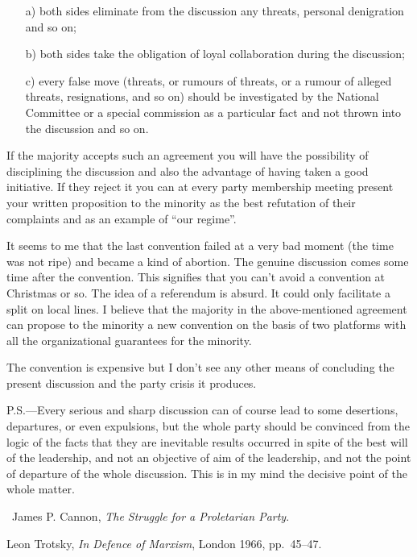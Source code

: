 \begin{enumerate}
  \item[a)] both sides eliminate from the discussion any threats, personal denigration and so on;
  \item[b)] both sides take the obligation of loyal collaboration during the discussion;
  \item[c)] every false move (threats, or rumours of threats, or a rumour of alleged threats, resignations, and so on) should be investigated by the National Committee or a special commission as a particular fact and not thrown into the discussion and so on.
\end{enumerate}

If the majority accepts such an agreement you will have the possibility of disciplining the discussion and also the advantage of having taken a good initiative. If they reject it you can at every party membership meeting present your written proposition to the minority as the best refutation of their complaints and as an example of “our regime”.

It seems to me that the last convention failed at a very bad moment (the time was not ripe) and became a kind of abortion. The genuine discussion comes some time after the convention. This signifies that you can’t avoid a convention at Christmas or so. The idea of a referendum is absurd. It could only facilitate a split on local lines. I believe that the majority in the above-mentioned agreement can propose to the minority a new convention on the basis of two platforms with all the organizational guarantees for the minority.

The convention is expensive but I don’t see any other means of concluding the present discussion and the party crisis it produces.


\begin{postscriptum}
  P.S.---Every serious and sharp discussion can of course lead to some desertions, departures, or even expulsions, but the whole party should be convinced from the logic of the facts that they are inevitable results occurred in spite of the best will of the leadership, and not an objective of aim of the leadership, and not the point of departure of the whole discussion. This is in my mind the decisive point of the whole matter.
\end{postscriptum}

\begin{letterinfo}
  \firstpublished\ James P. Cannon, \emph{The Struggle for a Proletarian Party}.
  
  \checkedagainst Leon Trotsky, \emph{In Defence of Marxism}, London 1966, pp.~45--47.
  
  \footnoteslatter
\end{letterinfo}